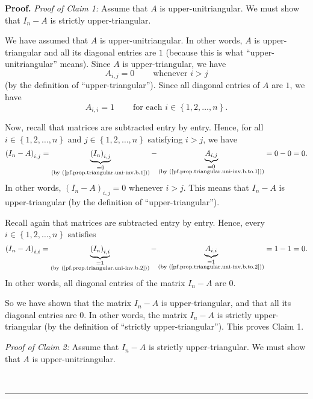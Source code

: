 \documentclass[numbers=enddot,12pt,final,onecolumn,notitlepage]{scrartcl}%
\theoremstyle{definition}
\newenvironment{proof}[1][Proof]{\noindent\textbf{#1.} }{\ \rule{0.5em}{0.5em}}
\begin{document}
\begin{proof}
\textit{Proof of Claim 1:} Assume that $A$ is upper-unitriangular. We must
show that $I_{n} - A$ is strictly upper-triangular.

We have assumed that $A$ is upper-unitriangular. In other words, $A$ is
upper-triangular and all its diagonal entries are $1$ (because this is what
``upper-unitriangular'' means). Since $A$ is upper-triangular, we have
\begin{equation}
A_{i, j} = 0 \ \ \ \ \ \ \ \ \ \ \text{whenever } i > j
\label{pf.prop.triangular.uni-inv.b.to.1}%
\end{equation}
(by the definition of ``upper-triangular''). Since all diagonal entries of $A$
are $1$, we have
\begin{equation}
A_{i, i} = 1 \ \ \ \ \ \ \ \ \ \ \text{for each } i \in\left\{  1,2,\ldots
,n\right\}  . \label{pf.prop.triangular.uni-inv.b.to.2}%
\end{equation}


Now, recall that matrices are subtracted entry by entry. Hence, for all $i
\in\left\{  1,2,\ldots,n\right\}  $ and $j \in\left\{  1,2,\ldots,n\right\}  $
satisfying $i > j$, we have
\[
\left(  I_{n} - A\right)  _{i, j} = \underbrace{\left(  I_{n}\right)  _{i,j}%
}_{\substack{= 0 \\\text{(by (\ref{pf.prop.triangular.uni-inv.b.1}))}}} -
\underbrace{A_{i,j}}_{\substack{= 0 \\\text{(by
(\ref{pf.prop.triangular.uni-inv.b.to.1}))}}} = 0 - 0 = 0.
\]
In other words, $\left(  I_{n} - A\right)  _{i, j} = 0$ whenever $i > j$. This
means that $I_{n} - A$ is upper-triangular (by the definition of ``upper-triangular'').

Recall again that matrices are subtracted entry by entry. Hence, every $i
\in\left\{  1, 2, \ldots, n\right\}  $ satisfies
\[
\left(  I_{n} - A\right)  _{i, i} = \underbrace{\left(  I_{n}\right)  _{i,i}%
}_{\substack{= 1 \\\text{(by (\ref{pf.prop.triangular.uni-inv.b.2}))}}} -
\underbrace{A_{i,i}}_{\substack{= 1 \\\text{(by
(\ref{pf.prop.triangular.uni-inv.b.to.2}))}}} = 1 - 1 = 0.
\]
In other words, all diagonal entries of the matrix $I_{n} - A$ are $0$.

So we have shown that the matrix $I_{n} - A$ is upper-triangular, and that all
its diagonal entries are $0$. In other words, the matrix $I_{n} - A$ is
strictly upper-triangular (by the definition of ``strictly
upper-triangular''). This proves Claim 1.

\textit{Proof of Claim 2:} Assume that $I_{n} - A$ is strictly
upper-triangular. We must show that $A$ is upper-unitriangular.


\end{proof}
\end{document}
